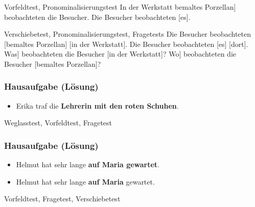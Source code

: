 {\begin{frame}
\pause 

\ea Vorfeldtest, Pronominalisierungstest \ras {} 
	\ea {[}In der Werkstatt bemaltes Porzellan{]} beobachteten die Besucher.
	\ex Die Besucher beobachteten [es].
	\z 

\pause 
	
\ex Verschiebetest, Pronominalisierungstest, Fragetests \ras {}
	\ea Die Besucher beobachteten [bemaltes Porzellan] [in der Werkstatt]. 
	\ex Die Besucher beobachteten [es] [dort].
	\ex {[}Was{]} beobachteten die Besucher [in der Werkstatt]?
	\ex {[}Wo{]} beobachteten die Besucher [bemaltes Porzellan]?
	\z
\z

\end{frame}



\begin{frame}
\frametitle{Hausaufgabe (Lösung)}

\begin{itemize}
	\item[] Erika traf die \textbf{Lehrerin mit den roten Schuhen}.
\end{itemize}

\pause 

\ea Weglasstest, Vorfeldtest, Fragetest \ras {}
	\z 
\z
\end{frame}



\begin{frame}
\frametitle{Hausaufgabe (Lösung)}

\begin{itemize}
	\item[] Helmut hat sehr lange \textbf{auf Maria gewartet}.
	
	\item[] Helmut hat sehr lange \textbf{auf Maria} gewartet.
\end{itemize}

\pause 

\ea Vorfeldtest, Fragetest, Verschiebetest \ras {}
	\z
\z 


\end{frame}}
